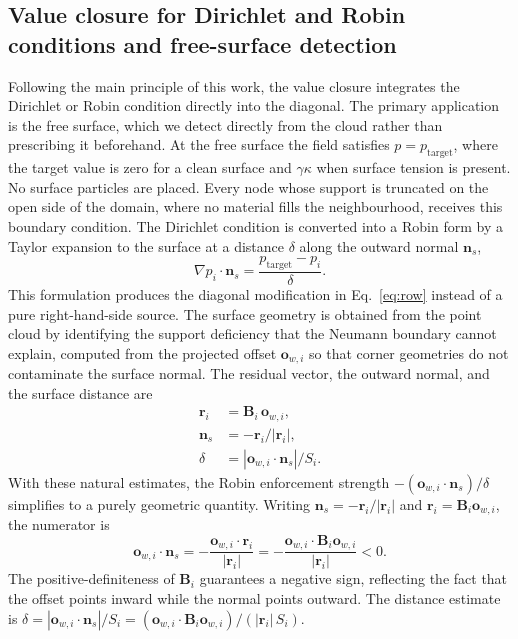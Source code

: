 \documentclass[preprint,review,12pt]{elsarticle}
\newcommand{\Bi}{\mathbf{B}_i}
\newcommand{\ow}{\mathbf{o}_{w,i}}
\newcommand{\ri}{\mathbf{r}_i}
\newcommand{\ns}{\mathbf{n}_s}
\begin{document}
\subsection{Value closure for Dirichlet and Robin conditions and free-surface detection}
\label{sec:surface}

Following the main principle of this work, the value closure integrates the Dirichlet or Robin condition directly into the diagonal.
The primary application is the free surface, which we detect directly from the cloud rather than prescribing it beforehand.
At the free surface the field satisfies $p=p_{\mathrm{target}}$, where the target value is zero for a clean surface and $\gamma\kappa$ when surface tension is present.
No surface particles are placed.
Every node whose support is truncated on the open side of the domain, where no material fills the neighbourhood, receives this boundary condition.
The Dirichlet condition is converted into a Robin form by a Taylor expansion to the surface at a distance $\delta$ along the outward normal $\ns$,
\begin{equation}
  \nabla p_i\cdot\ns=\frac{p_{\mathrm{target}}-p_i}{\delta}.
  \label{eq:dir2robin}
\end{equation}
This formulation produces the diagonal modification in Eq.~\eqref{eq:row} instead of a pure right-hand-side source.
The surface geometry is obtained from the point cloud by identifying the support deficiency that the Neumann boundary cannot explain, computed from the projected offset $\ow$ so that corner geometries do not contaminate the surface normal.
The residual vector, the outward normal, and the surface distance are
\begin{align}
  \ri &= \Bi\,\ow, \label{eq:ri}\\
  \ns &= -\ri/|\ri|, \label{eq:ns}\\
  \delta &= |\ow\cdot\ns|/S_i. \label{eq:delta}
\end{align}
With these natural estimates, the Robin enforcement strength $-(\ow\cdot\ns)/\delta$ simplifies to a purely geometric quantity.
Writing $\ns=-\ri/|\ri|$ and $\ri=\Bi\ow$, the numerator is
\begin{equation}
  \ow\cdot\ns=-\frac{\ow\cdot\ri}{|\ri|}=-\frac{\ow\cdot\Bi\ow}{|\ri|}<0.
  \label{eq:odn}
\end{equation}
The positive-definiteness of $\Bi$ guarantees a negative sign, reflecting the fact that the offset points inward while the normal points outward.
The distance estimate is $\delta=|\ow\cdot\ns|/S_i=(\ow\cdot\Bi\ow)/(|\ri|\,S_i)$.
\end{document}
